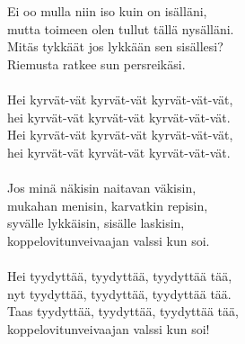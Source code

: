 
            Ei oo mulla niin iso kuin on isälläni,  \\
            mutta toimeen olen tullut tällä nysälläni.  \\
            Mitäs tykkäät jos lykkään sen sisällesi?  \\
            Riemusta ratkee sun persreikäsi. \\
\hspace{10mm} \\
            Hei kyrvät-vät kyrvät-vät kyrvät-vät-vät,  \\
            hei kyrvät-vät kyrvät-vät kyrvät-vät-vät.  \\
            Hei kyrvät-vät kyrvät-vät kyrvät-vät-vät,  \\
            hei kyrvät-vät kyrvät-vät kyrvät-vät-vät. \\
\hspace{10mm} \\
            Jos minä näkisin naitavan väkisin,  \\
            mukahan menisin, karvatkin repisin,  \\
            syvälle lykkäisin, sisälle laskisin, \\
            koppelovitunveivaajan valssi kun soi. \\
\hspace{10mm} \\
            Hei tyydyttää, tyydyttää, tyydyttää tää,  \\
            nyt tyydyttää, tyydyttää, tyydyttää tää.  \\
            Taas tyydyttää, tyydyttää, tyydyttää tää,  \\
            koppelovitunveivaajan valssi kun soi! \\

